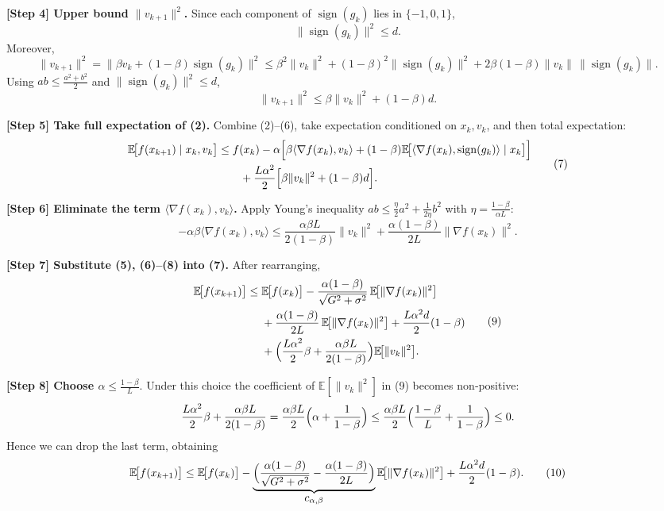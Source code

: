 \documentclass{article}
\newcommand{\sign}{\operatorname{sign}}
\newcommand{\E}{\mathbb{E}}
\begin{document}
\noindent\textbf{[Step 4] Upper bound $\|v_{k+1}\|^{2}$.}  
Since each component of $\sign(g_{k})$ lies in $\{-1,0,1\}$,
\[
\|\sign(g_{k})\|^{2}\le d.
\]
Moreover,
\[
\|v_{k+1}\|^{2} = \|\beta v_{k}+(1-\beta)\sign(g_{k})\|^{2}
\le \beta^{2}\|v_{k}\|^{2} + (1-\beta)^{2}\|\sign(g_{k})\|^{2}
+2\beta(1-\beta)\|v_{k}\|\,\|\sign(g_{k})\|.
\]
Using $ab\le\frac{a^{2}+b^{2}}{2}$ and $\|\sign(g_{k})\|^{2}\le d$,
\[
\|v_{k+1}\|^{2}\le \beta\|v_{k}\|^{2} + (1-\beta)d.
\tag{6}
\]

\noindent\textbf{[Step 5] Take full expectation of (2).}  
Combine (2)–(6), take expectation conditioned on $x_{k},v_{k}$, and then total expectation:
\[
\begin{aligned}
\E\!\bigl[f(x_{k+1})\mid x_{k},v_{k}\bigr]
&\le f(x_{k})
- \alpha\Bigl[\beta\langle\nabla f(x_{k}),v_{k}\rangle
+ (1-\beta)\E\!\bigl[\langle\nabla f(x_{k}),\sign(g_{k})\rangle\mid x_{k}\bigr]\Bigr]\\
&\qquad
+ \frac{L\alpha^{2}}{2}\Bigl[\beta\|v_{k}\|^{2}+(1-\beta)d\Bigr].
\end{aligned}
\tag{7}
\]

\noindent\textbf{[Step 6] Eliminate the term $\langle\nabla f(x_{k}),v_{k}\rangle$.}  
Apply Young’s inequality $ab\le \frac{\eta}{2}a^{2}+\frac{1}{2\eta}b^{2}$ with $\eta=\frac{1-\beta}{\alpha L}$:
\[
-\alpha\beta\langle\nabla f(x_{k}),v_{k}\rangle
\le \frac{\alpha\beta L}{2(1-\beta)}\|v_{k}\|^{2}
+ \frac{\alpha(1-\beta)}{2L}\|\nabla f(x_{k})\|^{2}.
\tag{8}
\]

\noindent\textbf{[Step 7] Substitute (5), (6)–(8) into (7).}  
After rearranging,
\[
\begin{aligned}
\E\!\bigl[f(x_{k+1})\bigr]
\le &\; \E\!\bigl[f(x_{k})\bigr]
- \frac{\alpha(1-\beta)}{\sqrt{G^{2}+\sigma^{2}}}\,\E\!\bigl[\|\nabla f(x_{k})\|^{2}\bigr] \\
&\; + \frac{\alpha(1-\beta)}{2L}\,\E\!\bigl[\|\nabla f(x_{k})\|^{2}\bigr]
+ \frac{L\alpha^{2}d}{2}(1-\beta)\\
&\; + \Bigl(\frac{L\alpha^{2}}{2}\beta+\frac{\alpha\beta L}{2(1-\beta)}\Bigr)\E\!\bigl[\|v_{k}\|^{2}\bigr].
\end{aligned}
\tag{9}
\]

\noindent\textbf{[Step 8] Choose $\alpha\le\frac{1-\beta}{L}$}.  
Under this choice the coefficient of $\E[\|v_{k}\|^{2}]$ in (9) becomes non‑positive:
\[
\frac{L\alpha^{2}}{2}\beta+\frac{\alpha\beta L}{2(1-\beta)}
= \frac{\alpha\beta L}{2}\Bigl(\alpha+\frac{1}{1-\beta}\Bigr)
\le \frac{\alpha\beta L}{2}\Bigl(\frac{1-\beta}{L}+\frac{1}{1-\beta}\Bigr)
\le 0.
\]
Hence we can drop the last term, obtaining
\[
\E\!\bigl[f(x_{k+1})\bigr]
\le \E\!\bigl[f(x_{k})\bigr]
- \underbrace{\Bigl(\frac{\alpha(1-\beta)}{\sqrt{G^{2}+\sigma^{2}}}
-\frac{\alpha(1-\beta)}{2L}\Bigr)}_{\displaystyle c_{\alpha,\beta}}
\E\!\bigl[\|\nabla f(x_{k})\|^{2}\bigr]
+ \frac{L\alpha^{2}d}{2}(1-\beta).
\tag{10}
\]
\end{document}
